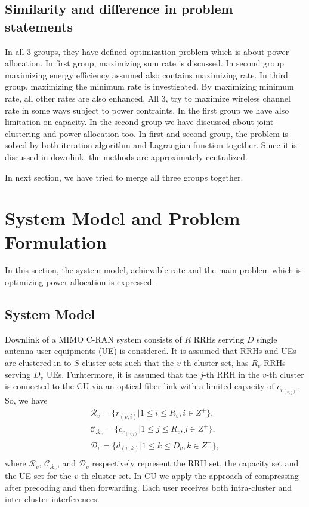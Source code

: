 \documentclass[journal,onecolumn,11pt,draftcls,doublespace]{IEEEtran}
\begin{document}
  \subsection{Similarity and difference in problem statements}
  In all 3 groups, they have defined optimization problem which is about power allocation. In first group, maximizing sum rate is discussed. In second group maximizing energy efficiency  assumed also contains
   maximizing rate. In third group, maximizing the minimum rate is investigated. By maximizing minimum rate, all other rates are also enhanced. 
   All 3, try to maximize wireless channel rate in some ways subject to power contraints. In the first group we have also limitation on capacity. In the second group we have discussed about joint clustering and power allocation too. In first and second group, the problem is solved by both iteration algorithm and Lagrangian function together. Since it is discussed in downlink. the methods are approximately centralized.
 
   
   In next section, we have tried to merge all three groups together.
\section{System Model and Problem Formulation}

In this section, the system model, achievable rate and the main problem which is optimizing power allocation is expressed.

\subsection{System Model}

Downlink of a MIMO C-RAN system consists of $R$ RRHs serving $D$ single antenna user equipments (UE) is considered. It is assumed that RRHs and UEs are clustered in to $S$ cluster sets such that the $v$-th cluster set, has $R_v$ RRHs serving ${D}_v$ UEs. Furhtermore, it is assumed that the $j$-th RRH in the $v$-th cluster is connected to the CU via an optical fiber link with a limited capacity of $c_{r_{(v,j)}}$. So, we have
\begin{equation}
\begin{split}
\mathcal{R}_v= \{  r_{(v,i)} | 1 \leq i \leq {R}_v , i\in Z^+\}, \\
\mathcal{C}_{\mathcal{R}_v}= \{c_{r_{(v,j)}}| 1 \leq j \leq {R}_v , j\in Z^+\}, \\
\mathcal{D}_v= \{  d_{(v,k)} | 1 \leq k \leq {D}_v , k\in Z^+\},  \\
\end{split}
\end{equation}
where $\mathcal{R}_v$, $\mathcal{C}_{\mathcal{R}_v}$, and $\mathcal{D}_v$ respectively represent the RRH set, the capacity set and the UE set  for the $v$-th cluster set.
In CU we apply the approach of compressing after precoding and then forwarding. Each user receives both intra-cluster and inter-cluster interferences.
\end{document}
